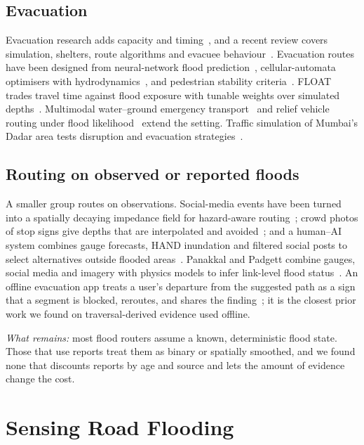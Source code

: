 \documentclass[journal]{IEEEtran}
\begin{document}
\subsection{Evacuation}
Evacuation research adds capacity and timing~\cite{lu2005evac,bayram2016evac}, and a recent review covers simulation, shelters, route algorithms and evacuee behaviour~\cite{li2025overview}. Evacuation routes have been designed from neural-network flood prediction~\cite{lee2020evac}, cellular-automata optimisers with hydrodynamics~\cite{he2021cadro}, and pedestrian stability criteria~\cite{li2021pedestrian}. FLOAT trades travel time against flood exposure with tunable weights over simulated depths~\cite{jao2025float}. Multimodal water--ground emergency transport~\cite{song2025multimodal} and relief vehicle routing under flood likelihood~\cite{toathom2024vrp} extend the setting. Traffic simulation of Mumbai's Dadar area tests disruption and evacuation strategies~\cite{lalwani2025dadar}.

\subsection{Routing on observed or reported floods}
A smaller group routes on observations. Social-media events have been turned into a spatially decaying impedance field for hazard-aware routing~\cite{fu2026social}; crowd photos of stop signs give depths that are interpolated and avoided~\cite{alizadeh2021signs}; and a human--AI system combines gauge forecasts, HAND inundation and filtered social posts to select alternatives outside flooded areas~\cite{karanjit2026hac}. Panakkal and Padgett combine gauges, social media and imagery with physics models to infer link-level flood status~\cite{panakkal2024eyes}. An offline evacuation app treats a user's departure from the suggested path as a sign that a segment is blocked, reroutes, and shares the finding~\cite{itoi2017offline}; it is the closest prior work we found on traversal-derived evidence used offline.

\emph{What remains:} most flood routers assume a known, deterministic flood state. Those that use reports treat them as binary or spatially smoothed, and we found none that discounts reports by age and source and lets the amount of evidence change the cost.

\section{Sensing Road Flooding}\label{sec:sensing}
\end{document}
